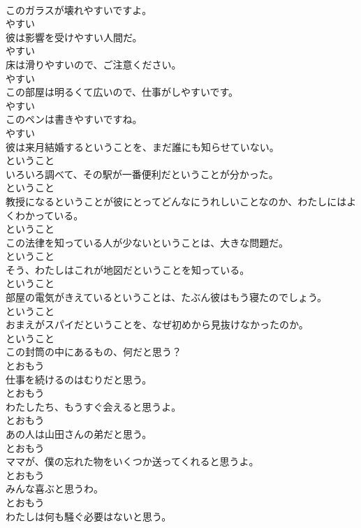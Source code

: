\documentclass[8pt]{extreport}
\begin{document}
\begin{CJK}{UTF8}{min}
\\	このガラスが壊れやすいですよ。	
\\	やすい
\\	彼は影響を受けやすい人間だ。	
\\	やすい
\\	床は滑りやすいので、ご注意ください。	
\\	やすい
\\	この部屋は明るくて広いので、仕事がしやすいです。	
\\	やすい
\\	このペンは書きやすいですね。	
\\	やすい
\\	彼は来月結婚するということを、まだ誰にも知らせていない。	
\\	ということ
\\	いろいろ調べて、その駅が一番便利だということが分かった。	
\\	ということ
\\	教授になるということが彼にとってどんなにうれしいことなのか、わたしにはよくわかっている。	
\\	ということ
\\	この法律を知っている人が少ないということは、大きな問題だ。	
\\	ということ
\\	そう、わたしはこれが地図だということを知っている。	
\\	ということ
\\	部屋の電気がきえているということは、たぶん彼はもう寝たのでしょう。	
\\	ということ
\\	おまえがスパイだということを、なぜ初めから見抜けなかったのか。	
\\	ということ
\\	この封筒の中にあるもの、何だと思う？	
\\	とおもう
\\	仕事を続けるのはむりだと思う。	
\\	とおもう
\\	わたしたち、もうすぐ会えると思うよ。	
\\	とおもう
\\	あの人は山田さんの弟だと思う。	
\\	とおもう
\\	ママが、僕の忘れた物をいくつか送ってくれると思うよ。	
\\	とおもう
\\	みんな喜ぶと思うわ。	
\\	とおもう
\\	わたしは何も騒ぐ必要はないと思う。	

\end{CJK}
\end{document}
